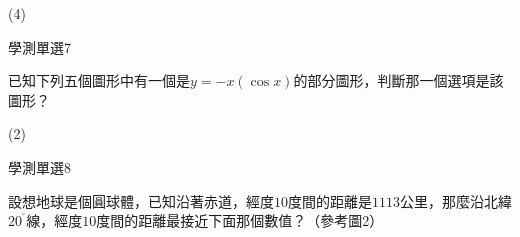 \begin{QUESTIONS}
\begin{QUESTION}
\begin{QBODY}
        \end{QBODY}
        \begin{QFROMS}
        \end{QFROMS}
        \begin{QTAGS}\end{QTAGS}
        \begin{QANS}
            (4)
        \end{QANS}
        \begin{QSOLLIST}
        \end{QSOLLIST}
        \begin{QEMPTYSPACE}
        \end{QEMPTYSPACE}
    \end{QUESTION}
    \begin{QUESTION}
        \begin{ExamInfo}{85}{學測}{單選}{7}
        \end{ExamInfo}
        \begin{ExamAnsRateInfo}{}{}{}{}
        \end{ExamAnsRateInfo}
        \begin{QBODY}
            已知下列五個圖形中有一個是$y=-x\left( \cos x \right)$的部分圖形，判斷那一個選項是該圖形？
        \end{QBODY}
        \begin{QFROMS}
        \end{QFROMS}
        \begin{QTAGS}\end{QTAGS}
        \begin{QANS}
            (2)
        \end{QANS}
        \begin{QSOLLIST}
        \end{QSOLLIST}
        \begin{QEMPTYSPACE}
        \end{QEMPTYSPACE}
    \end{QUESTION}
    \begin{QUESTION}
        \begin{ExamInfo}{85}{學測}{單選}{8}
        \end{ExamInfo}
        \begin{ExamAnsRateInfo}{}{}{}{}
        \end{ExamAnsRateInfo}
        \begin{QBODY}
            設想地球是個圓球體，已知沿著赤道，經度$10$度間的距離是$1113$公里，那麼沿北緯${{20}^{{}^\circ }}$線，經度$10$度間的距離最接近下面那個數值？（參考圖2）

\end{QBODY}
\end{QUESTION}
\end{QUESTIONS}
